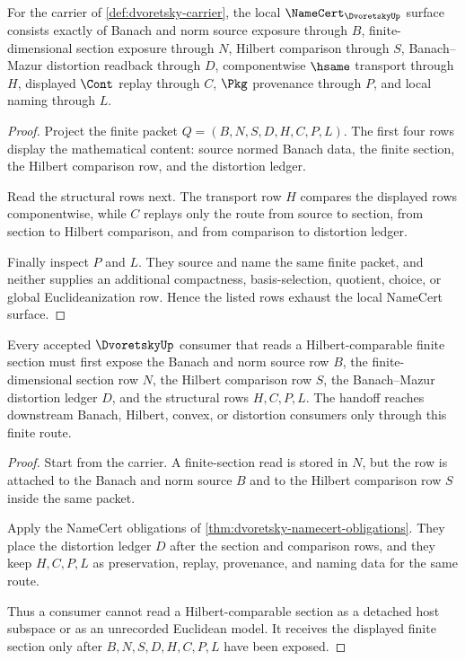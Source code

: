 \begin{theorem}
\label{thm:dvoretsky-namecert-obligations}
For the carrier of \autoref{def:dvoretsky-carrier}, the local $\NameCert_{\DvoretskyUp}$ surface consists exactly of Banach and norm source exposure through $B$, finite-dimensional section exposure through $N$, Hilbert comparison through $S$, Banach--Mazur distortion readback through $D$, componentwise $\hsame$ transport through $H$, displayed $\Cont$ replay through $C$, $\Pkg$ provenance through $P$, and local naming through $L$.
\end{theorem}
\begin{proof}
Project the finite packet $Q=(B,N,S,D,H,C,P,L)$. The first four rows display the mathematical content: source normed Banach data, the finite section, the Hilbert comparison row, and the distortion ledger.

Read the structural rows next. The transport row $H$ compares the displayed rows componentwise, while $C$ replays only the route from source to section, from section to Hilbert comparison, and from comparison to distortion ledger.

Finally inspect $P$ and $L$. They source and name the same finite packet, and neither supplies an additional compactness, basis-selection, quotient, choice, or global Euclideanization row. Hence the listed rows exhaust the local NameCert surface.
\end{proof}

\begin{theorem}
\label{thm:dvoretsky-finite-dimensional-section-handoff}
Every accepted $\DvoretskyUp$ consumer that reads a Hilbert-comparable finite section must first expose the Banach and norm source row $B$, the finite-dimensional section row $N$, the Hilbert comparison row $S$, the Banach--Mazur distortion ledger $D$, and the structural rows $H,C,P,L$. The handoff reaches downstream Banach, Hilbert, convex, or distortion consumers only through this finite route.
\end{theorem}
\begin{proof}
Start from the carrier. A finite-section read is stored in $N$, but the row is attached to the Banach and norm source $B$ and to the Hilbert comparison row $S$ inside the same packet.

Apply the NameCert obligations of \autoref{thm:dvoretsky-namecert-obligations}. They place the distortion ledger $D$ after the section and comparison rows, and they keep $H,C,P,L$ as preservation, replay, provenance, and naming data for the same route.

Thus a consumer cannot read a Hilbert-comparable section as a detached host subspace or as an unrecorded Euclidean model. It receives the displayed finite section only after $B,N,S,D,H,C,P,L$ have been exposed.
\end{proof}

